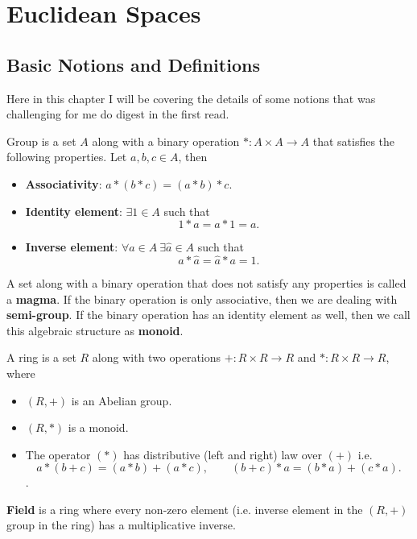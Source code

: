 \chapter{Euclidean Spaces}

\section{Basic Notions and Definitions}

Here in this chapter I will be covering the details of some notions that was challenging for me do digest in the first read.


\begin{definition}
	Group is a set $ A $ along with a binary operation $ *: A\times A \to A $ that satisfies the following properties. Let $ a,b,c \in A $, then
	\begin{itemize}
		\item \textbf{Associativity}: $ a*(b*c) = (a*b)*c $.
		\item \textbf{Identity element}: $ \exists 1 \in A $ such that 
		\[ 1*a = a*1 = a. \]
		\item \textbf{Inverse element}: $ \forall a \in A\ \exists\hat{a}\in A $ such that 
		\[ a*\hat{a} = \hat{a}*a = 1. \]
	\end{itemize}
\end{definition}
\begin{remark}
	A set along with a binary operation that does not satisfy any properties is called a \textbf{magma}. If the binary operation is only associative, then we are dealing with \textbf{semi-group}. If the binary operation has an identity element as well, then we call this algebraic structure as \textbf{monoid}.
\end{remark}

\begin{definition}
	A ring is a set $ R $ along with two operations $ +: R\times R \to R $ and $ *: R\times R \to R $, where
	\begin{itemize}
		\item $ (R,+) $ is an Abelian group.
		\item $ (R,*) $ is a monoid.
		\item The operator $ (*) $ has distributive (left and right) law over $ (+) $ i.e.
  			\[a*(b+c) = (a*b)+(a*c), \qquad (b+c)*a = (b*a) + (c*a).\].
	\end{itemize}
\end{definition}

\begin{remark}
	\textbf{Field} is a ring where every non-zero element (i.e. inverse element in the $ (R,+) $ group in the ring) has a multiplicative inverse.
\end{remark}

